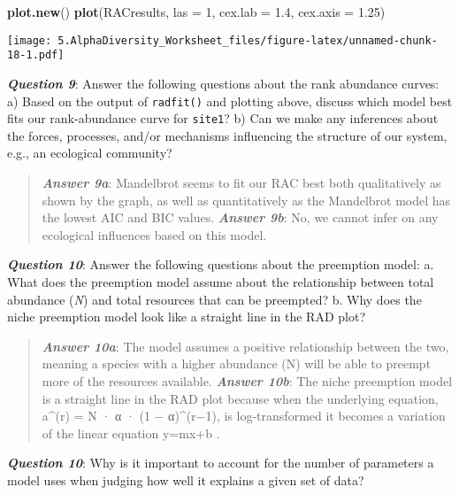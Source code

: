 \documentclass[
]{article}
\newenvironment{Shaded}{\begin{snugshade}}{\end{snugshade}}
\newcommand{\AttributeTok}[1]{\textcolor[rgb]{0.13,0.29,0.53}{#1}}
\newcommand{\DecValTok}[1]{\textcolor[rgb]{0.00,0.00,0.81}{#1}}
\newcommand{\FloatTok}[1]{\textcolor[rgb]{0.00,0.00,0.81}{#1}}
\newcommand{\FunctionTok}[1]{\textcolor[rgb]{0.13,0.29,0.53}{\textbf{#1}}}
\newcommand{\NormalTok}[1]{#1}
\begin{document}
\begin{Shaded}
\begin{Highlighting}[]
\FunctionTok{plot.new}\NormalTok{()}
\FunctionTok{plot}\NormalTok{(RACresults, }\AttributeTok{las =} \DecValTok{1}\NormalTok{, }\AttributeTok{cex.lab =} \FloatTok{1.4}\NormalTok{, }\AttributeTok{cex.axis =} \FloatTok{1.25}\NormalTok{)}
\end{Highlighting}
\end{Shaded}

\texttt{[image: 5.AlphaDiversity\_Worksheet\_files/figure-latex/unnamed-chunk-18-1.pdf]}

\textbf{\emph{Question 9}}: Answer the following questions about the
rank abundance curves: a) Based on the output of \texttt{radfit()} and
plotting above, discuss which model best fits our rank-abundance curve
for \texttt{site1}? b) Can we make any inferences about the forces,
processes, and/or mechanisms influencing the structure of our system,
e.g., an ecological community?

\begin{quote}
\textbf{\emph{Answer 9a}}: Mandelbrot seems to fit our RAC best both
qualitatively as shown by the graph, as well as quantitatively as the
Mandelbrot model has the lowest AIC and BIC values. \textbf{\emph{Answer
9b}}: No, we cannot infer on any ecological influences based on this
model.
\end{quote}

\textbf{\emph{Question 10}}: Answer the following questions about the
preemption model: a. What does the preemption model assume about the
relationship between total abundance (\emph{N}) and total resources that
can be preempted? b. Why does the niche preemption model look like a
straight line in the RAD plot?

\begin{quote}
\textbf{\emph{Answer 10a}}: The model assumes a positive relationship
between the two, meaning a species with a higher abundance (N) will be
able to preempt more of the resources available. \textbf{\emph{Answer
10b}}: The niche preemption model is a straight line in the RAD plot
because when the underlying equation, a\^{}(r) = N · α · (1 −
α)\^{}(r−1), is log-transformed it becomes a variation of the linear
equation y=mx+b .
\end{quote}

\textbf{\emph{Question 10}}: Why is it important to account for the
number of parameters a model uses when judging how well it explains a
given set of data?
\end{document}
